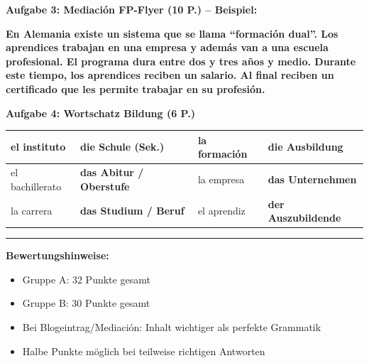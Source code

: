 \documentclass[11pt,a4paper]{article}
\newcommand{\lsg}[1]{\textcolor{loesung}{\textbf{#1}}}
\begin{document}
\begin{gruppeBbox}
\vspace{0.5em}

\textbf{Aufgabe 3: Mediación FP-Flyer (10 P.) -- Beispiel:}

\lsg{En Alemania existe un sistema que se llama ``formación dual''. Los aprendices trabajan en una empresa y además van a una escuela profesional. El programa dura entre dos y tres años y medio. Durante este tiempo, los aprendices reciben un salario. Al final reciben un certificado que les permite trabajar en su profesión.}

\vspace{0.5em}

\textbf{Aufgabe 4: Wortschatz Bildung (6 P.)}

\begin{tabularx}{\textwidth}{@{}|X|X|X|X|@{}}
\hline
el instituto & \lsg{die Schule (Sek.)} & la formación & \lsg{die Ausbildung} \\
\hline
el bachillerato & \lsg{das Abitur / Oberstufe} & la empresa & \lsg{das Unternehmen} \\
\hline
la carrera & \lsg{das Studium / Beruf} & el aprendiz & \lsg{der Auszubildende} \\
\hline
\end{tabularx}

\end{gruppeBbox}

\vspace{1em}
\hrule
\vspace{0.3em}

\textbf{Bewertungshinweise:}
\begin{itemize}[leftmargin=1.5em, nosep]
    \item Gruppe A: 32 Punkte gesamt
    \item Gruppe B: 30 Punkte gesamt
    \item Bei Blogeintrag/Mediación: Inhalt wichtiger als perfekte Grammatik
    \item Halbe Punkte möglich bei teilweise richtigen Antworten
\end{itemize}
\end{document}
